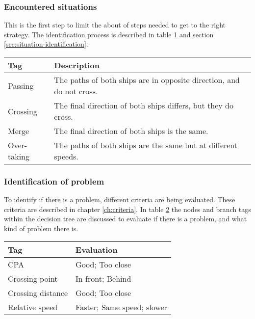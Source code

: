 \subsubsection{Encountered situations}
This is the first step to limit the about of steps needed to get to the right strategy. The identification process is described in table \ref{tab:situations} and section \ref{sec:situation-identification}.
\begin{table}[H]
	\begin{tabular}{p{}|p{}}
		\toprule
		Tag & Description\\
		\midrule
		Passing & The paths of both ships are in opposite direction, and do not cross. \\
		Crossing & The final direction of both ships differs, but they do cross. \\
		Merge & The final direction of both ships is the same. \\
		Over-taking & The paths of both ships are the same but at different speeds. \\
		\bottomrule
	\end{tabular}
	
	\label{tab:situations}
\end{table}

\subsubsection{Identification of problem}
To identify if there is a problem, different criteria are being evaluated. These criteria are described in chapter \ref{ch:criteria}. In table \ref{tab:identification-criteria} the nodes and branch tags within the decision tree are discussed to evaluate if there is a problem, and what kind of problem there is. 
\begin{table}[H]
	\begin{tabular}{p{}|p{}}
		\toprule
		Tag & Evaluation \\
		\midrule
		\acf{CPA} & Good; Too close \\
		Crossing point & In front; Behind \\
		Crossing distance & Good; Too close \\
		Relative speed & Faster; Same speed; slower \\
		\bottomrule
	\end{tabular}
	
	\label{tab:identification-criteria}
\end{table}

